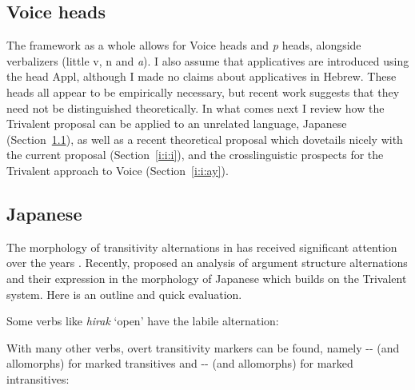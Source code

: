 \begin{exe}
\begin{xlist}
\begin{xlist}
\begin{xlist}
\begin{xlist}
\begin{xlist}
\begin{xlist}
\begin{exe}
\begin{xlist}
\begin{exe}
\begin{exe}
\begin{xlist}
\begin{exe}
\section{Voice heads} \label{i:i}
The framework as a whole allows for Voice heads and \emph{p} heads, alongside verbalizers (little v, n and \textit{a}). I also assume that applicatives are introduced using the head Appl, although I made no claims about applicatives in Hebrew. These heads all appear to be empirically necessary, but recent work suggests that they need not be distinguished theoretically. In what comes next I review how the Trivalent proposal can be applied to an unrelated language, Japanese (Section~\ref{i:i:jap}), as well as a recent theoretical proposal which dovetails nicely with the current proposal (Section~\ref{i:i:i}), and the crosslinguistic prospects for the Trivalent approach to Voice (Section~\ref{i:i:ay}).

	\subsection{Japanese} \label{i:i:jap}
The morphology of transitivity alternations in  has received significant attention over the years \citep{suga80,jacobsen92,miyagawa98,nishiyama98,volpe05,harley08}. Recently, \cite{oseki17nyu} proposed an analysis of argument structure alternations and their expression in the morphology of Japanese which builds on the Trivalent system. Here is an outline and quick evaluation.

Some verbs like \emph{hirak} `open' have the labile alternation:
 \begin{exe}
 \ex  {}
 \begin{xlist} 
	
	
 \z
\z 

With many other verbs, overt transitivity markers can be found, namely -- (and allomorphs) for marked transitives and -- (and allomorphs) for marked intransitives:
 \begin{exe}
 \ex  
 \begin{xlist} 
	

\end{xlist}
\end{exe}
\end{xlist}
\end{exe}
\end{exe}
\end{xlist}
\end{exe}
\end{exe}
\end{xlist}
\end{exe}
\end{xlist}
\end{xlist}
\end{xlist}
\end{xlist}
\end{xlist}
\end{xlist}
\end{exe}
